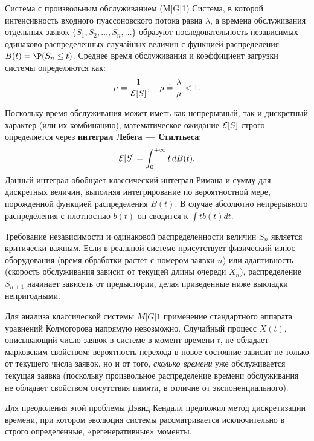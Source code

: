 \begin{definition}{Система с произвольным обслуживанием (M|G|1)}
Система, в которой интенсивность входного пуассоновского потока равна $\lambda$, а времена обслуживания отдельных заявок $\{S_1, S_2, \dots, S_n, \dots\}$ образуют последовательность независимых одинаково распределенных случайных величин с функцией распределения $B(t) = \P(S_n \le t)$. Среднее время обслуживания и коэффициент загрузки системы определяются как:
$$
\mu \doteq \frac{1}{\mathcal{E}[S]}, \quad \rho \doteq \frac{\lambda}{\mu} < 1.
$$
\end{definition}

\begin{note}[1]
Поскольку время обслуживания может иметь как непрерывный, так и дискретный характер (или их комбинацию), математическое ожидание $\mathcal{E}[S]$ строго определяется через \textbf{интеграл Лебега — Стилтьеса}:
$$
\mathcal{E}[S] = \int_{0}^{+\infty} t \, dB(t).
$$
Данный интеграл обобщает классический интеграл Римана и сумму для дискретных величин, выполняя интегрирование по вероятностной мере, порожденной функцией распределения $B(t)$. В случае абсолютно непрерывного распределения с плотностью $b(t)$ он сводится к $\int t b(t) dt$.
\end{note}

\begin{note}[2]
Требование независимости и одинаковой распределенности величин $S_n$ является критически важным. Если в реальной системе присутствует физический износ оборудования (время обработки растет с номером заявки $n$) или адаптивность (скорость обслуживания зависит от текущей длины очереди $X_n$), распределение $S_{n+1}$ начинает зависеть от предыстории, делая приведенные ниже выкладки непригодными.
\end{note}

Для анализа классической системы $M|G|1$ применение стандартного аппарата уравнений Колмогорова напрямую невозможно. Случайный процесс $X(t)$, описывающий число заявок в системе в момент времени $t$, не обладает марковским свойством: вероятность перехода в новое состояние зависит не только от текущего числа заявок, но и от того, \textit{сколько времени} уже обслуживается текущая заявка (поскольку произвольное распределение времени обслуживания не обладает свойством отсутствия памяти, в отличие от экспоненциального). 

Для преодоления этой проблемы Дэвид Кендалл предложил метод дискретизации времени, при котором эволюция системы рассматривается исключительно в строго определенные, «регенеративные» моменты.

